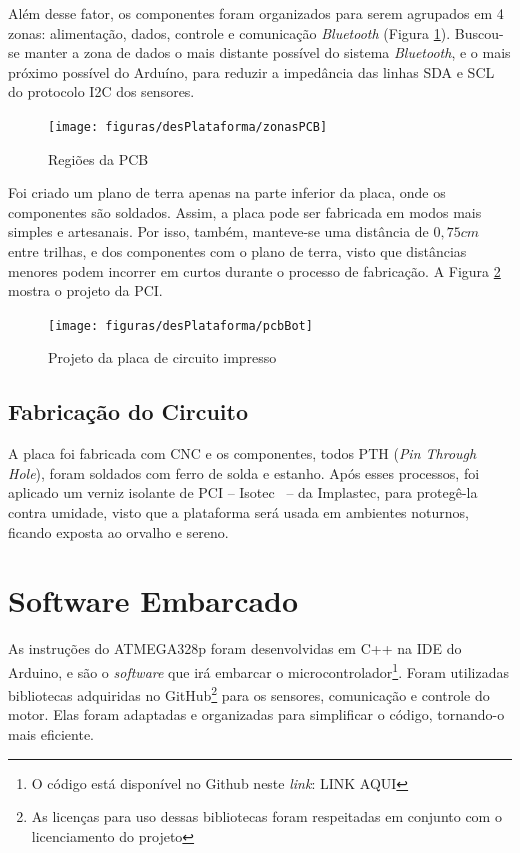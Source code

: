 Além desse fator, os componentes foram organizados para serem agrupados em 4 zonas: alimentação, dados, controle e comunicação \textit{Bluetooth} (Figura \ref{fig:zonasPcb}). Buscou-se manter a zona de dados o mais distante possível do sistema \textit{Bluetooth}, e o mais próximo possível do Arduíno, para reduzir a impedância das linhas SDA e SCL do protocolo I2C dos sensores.

\begin{figure}[!htb]
	\centering
	\caption{Regiões da PCB}
	\texttt{[image: figuras/desPlataforma/zonasPCB]}
	\label{fig:zonasPcb}
\end{figure}  

Foi criado um plano de terra apenas na parte inferior da placa, onde os componentes são soldados. Assim, a placa pode ser fabricada em modos mais simples e artesanais. Por isso, também, manteve-se uma distância de $ 0,75 cm $ entre trilhas, e dos componentes com o plano de terra, visto que distâncias menores podem incorrer em curtos durante o processo de fabricação. A Figura \ref{fig:pcbBot} mostra o projeto da PCI.

\begin{figure}[!htb]
	\centering
	\caption{Projeto da placa de circuito impresso}
	\texttt{[image: figuras/desPlataforma/pcbBot]}
	\label{fig:pcbBot}
\end{figure}


\subsection{Fabricação do Circuito}
A placa foi fabricada com CNC e os componentes, todos PTH (\textit{Pin Through Hole}), foram soldados com ferro de solda e estanho. Após esses processos, foi aplicado um verniz isolante de PCI -- Isotec \textregistered ~-- da Implastec, para protegê-la contra umidade, visto que a plataforma será usada em ambientes noturnos, ficando exposta ao orvalho e sereno.

\section{Software Embarcado}

As instruções do ATMEGA328p foram desenvolvidas em C++ na IDE do Arduino, e são o \textit{software} que irá embarcar o microcontrolador\footnote{O código está disponível no Github neste \textit{link}: LINK AQUI}. Foram utilizadas bibliotecas adquiridas no GitHub\footnote{As licenças para uso dessas bibliotecas foram respeitadas em conjunto com o licenciamento do projeto} para os sensores, comunicação e controle do motor. Elas foram adaptadas e organizadas para simplificar o código, tornando-o mais eficiente. 

